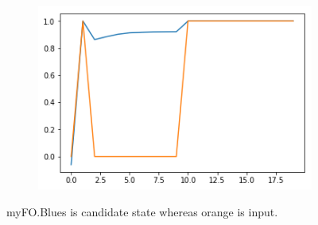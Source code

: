 \documentclass[12pt, letterpaper]{article}
\begin{document}
\begin{figure}[h]
\begin{subfigure}[b]{0.3\textwidth}
        \includegraphics[width=\textwidth]{of_c3}
        \label{fig:mouse}
    \end{subfigure}
    \caption{myFO.Blues is candidate state whereas orange is input.}\label{fig:animals}
\end{figure}
\end{document}
